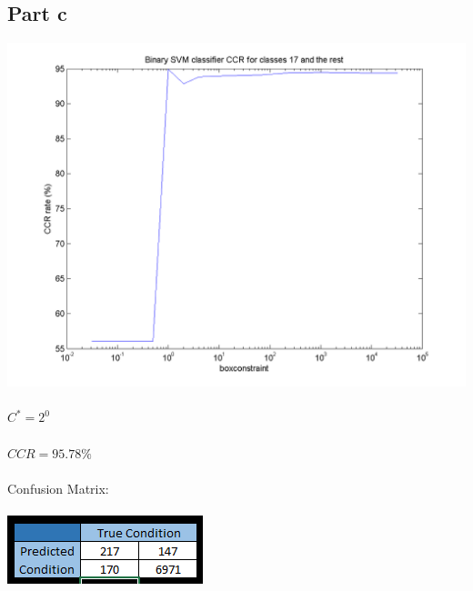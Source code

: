 \documentclass[paper=a4, fontsize=11pt]{scrartcl} %
\numberwithin{equation}{section} %
\numberwithin{figure}{section} %
\numberwithin{table}{section} %
\begin{document}
	\subsection{Part c}
	\includegraphics[scale=0.8]{part_c_CV_CCR}
	\\\\
	$C^* = 2^0$
	\\\\
	$CCR = 95.78\%$
	\\\\
	Confusion Matrix:
	\\\\
	\includegraphics{part_c_confusion_matrix}
	
\end{document}
